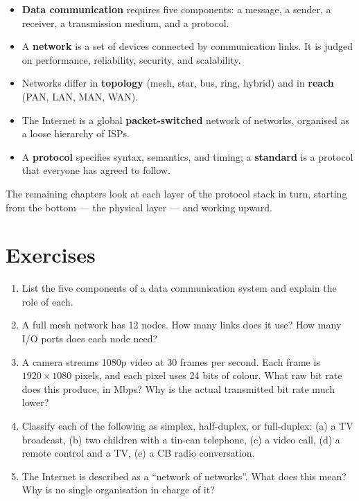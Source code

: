 \documentclass[
  letterpaper,
  DIV=11,
  numbers=noendperiod]{scrreprt}
\providecommand{\tightlist}{%
  \setlength{\itemsep}{0pt}\setlength{\parskip}{0pt}}
\begin{document}
\begin{itemize}
\tightlist
\item
  \textbf{Data communication} requires five components: a message, a
  sender, a receiver, a transmission medium, and a protocol.
\item
  A \textbf{network} is a set of devices connected by communication
  links. It is judged on performance, reliability, security, and
  scalability.
\item
  Networks differ in \textbf{topology} (mesh, star, bus, ring, hybrid)
  and in \textbf{reach} (PAN, LAN, MAN, WAN).
\item
  The Internet is a global \textbf{packet-switched} network of networks,
  organised as a loose hierarchy of ISPs.
\item
  A \textbf{protocol} specifies syntax, semantics, and timing; a
  \textbf{standard} is a protocol that everyone has agreed to follow.
\end{itemize}

The remaining chapters look at each layer of the protocol stack in turn,
starting from the bottom --- the physical layer --- and working upward.

\section*{Exercises}\label{exercises}


\begin{enumerate}
\def\labelenumi{\arabic{enumi}.}
\tightlist
\item
  List the five components of a data communication system and explain
  the role of each.
\item
  A full mesh network has 12 nodes. How many links does it use? How many
  I/O ports does each node need?
\item
  A camera streams 1080p video at 30 frames per second. Each frame is
  \(1920 \times 1080\) pixels, and each pixel uses 24 bits of colour.
  What raw bit rate does this produce, in Mbps? Why is the actual
  transmitted bit rate much lower?
\item
  Classify each of the following as simplex, half-duplex, or
  full-duplex: (a) a TV broadcast, (b) two children with a tin-can
  telephone, (c) a video call, (d) a remote control and a TV, (e) a CB
  radio conversation.
\item
  The Internet is described as a ``network of networks''. What does this
  mean? Why is no single organisation in charge of it?
\end{enumerate}
\end{document}
